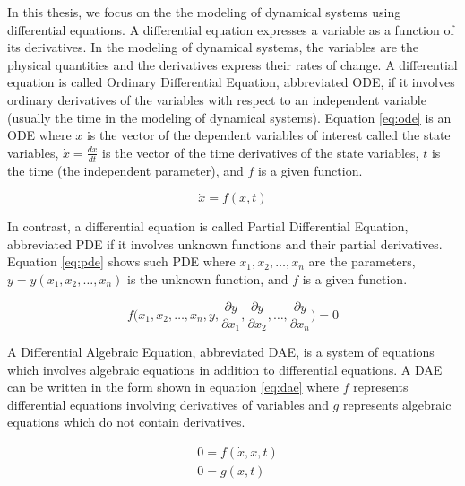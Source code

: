 In this thesis, we focus on the the modeling of dynamical systems using differential equations. A differential equation expresses a variable as a function of its derivatives. In the modeling of dynamical systems, the variables are the physical quantities and the derivatives express their rates of change. A differential equation is called Ordinary Differential Equation, abbreviated ODE, if it involves ordinary derivatives of the variables with respect to an independent variable (usually the time in the modeling of dynamical systems).  Equation \ref{eq:ode} is an ODE where $x$ is the vector of the dependent variables of interest called the state variables, $\dot{x} = \frac{dx}{dt}$ is the vector of the time derivatives of the state variables, $t$ is the time (the independent parameter), and $f$ is a given function.

\begin{equation}
\dot{x} = f(x,t)
\label{eq:ode}
\end{equation}

In contrast, a differential equation is called Partial Differential Equation, abbreviated PDE if it involves unknown functions and their partial derivatives. Equation \ref{eq:pde} shows such PDE where $x_1,x_2,\dots, x_n$ are the parameters, $y=y(x_1,x_2,\dots, x_n)$ is the unknown function, and $f$ is a given function.

\begin{equation}
f\biggl(x_1,x_2,\dots, x_n,y,\frac{\partial y}{\partial x_1},\frac{\partial y}{\partial x_2},\dots,\frac{\partial y}{\partial x_n}\biggl)=0
\label{eq:pde}
\end{equation} 

A Differential Algebraic Equation, abbreviated DAE, is a system of equations which involves algebraic equations in addition to differential equations. A DAE can be written in the form shown in equation \ref{eq:dae} where $f$ represents differential equations involving derivatives of variables and $g$ represents algebraic equations which do not contain derivatives.

\begin{equation}
\begin{aligned}
&0 = f(\dot{x},x,t)\\
&0 = g(x,t)
\end{aligned}
\label{eq:dae}
\end{equation}
  
